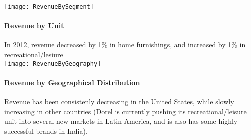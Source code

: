 \texttt{[image: RevenueBySegment]}
\paragraph{Revenue by Unit}In 2012, revenue decreased by 1\% in home furnishings, and increased by 1\% in recreational/lesiure
\\[1\baselineskip]

\texttt{[image: RevenueByGeography]}
\paragraph{Revenue by Geographical Distribution}Revenue has been consistenly decreasing in the United States, while slowly increasing in other countries (Dorel is currently pushing its recreational/leisure unit into several new markets in Latin America, and is also has some highly successful brands in India).